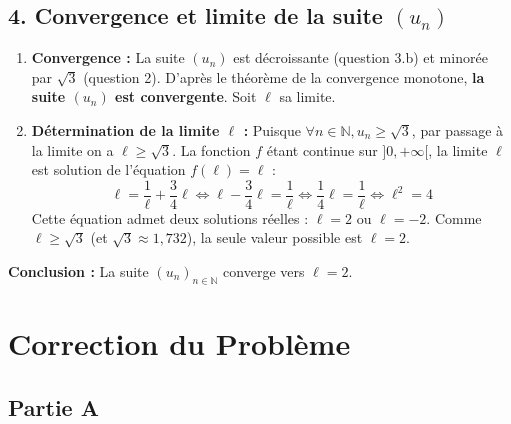 \documentclass[12pt,a4paper]{article}
\begin{document}
\subsection*{4. Convergence et limite de la suite $(u_n)$}
\begin{enumerate}
    \item \textbf{Convergence :} La suite $(u_n)$ est décroissante (question 3.b) et minorée par $\sqrt{3}$ (question 2). D'après le théorème de la convergence monotone, \textbf{la suite $(u_n)$ est convergente}. Soit $\ell$ sa limite.
    \item \textbf{Détermination de la limite $\ell$ :} 
    Puisque $\forall n \in \mathbb{N}, u_n \ge \sqrt{3}$, par passage à la limite on a $\ell \ge \sqrt{3}$.
    La fonction $f$ étant continue sur $]0, +\infty[$, la limite $\ell$ est solution de l'équation $f(\ell) = \ell$ :
    \[ \ell = \frac{1}{\ell} + \frac{3}{4}\ell \iff \ell - \frac{3}{4}\ell = \frac{1}{\ell} \iff \frac{1}{4}\ell = \frac{1}{\ell} \iff \ell^2 = 4 \]
    Cette équation admet deux solutions réelles : $\ell = 2$ ou $\ell = -2$.
    Comme $\ell \ge \sqrt{3}$ (et $\sqrt{3} \approx 1,732$), la seule valeur possible est $\ell = 2$.
\end{enumerate}
\textbf{Conclusion :} La suite $(u_n)_{n \in \mathbb{N}}$ converge vers $\ell = 2$.

\section*{Correction du Problème}

\subsection*{Partie A}
\end{document}
